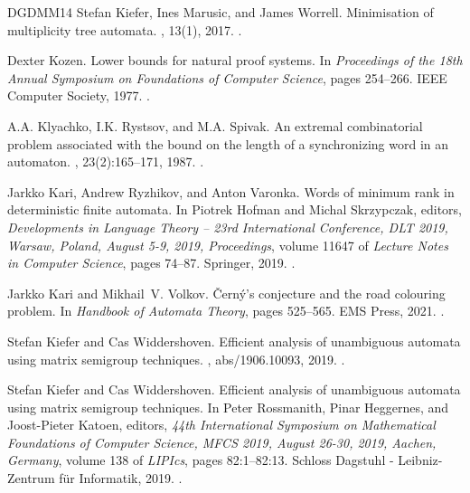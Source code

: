 \documentclass[11pt,a4paper]{amsart}
\theoremstyle{plain}
\theoremstyle{definition}
\theoremstyle{defC}
\theoremstyle{thmC}
\theoremstyle{plain}
\numberwithin{equation}{section}
\begin{document}
\begin{thebibliography}{DGDMM14}
Stefan Kiefer, Ines Marusic, and James Worrell.
\newblock Minimisation of multiplicity tree automata.
, 13(1), 2017.
\newblock \href {https://doi.org/10.23638/LMCS-13(1:16)2017}
  {}.

Dexter Kozen.
\newblock Lower bounds for natural proof systems.
\newblock In {\em Proceedings of the 18th Annual Symposium on Foundations of
  Computer Science}, pages 254--266. IEEE Computer Society, 1977.
\newblock \href {https://doi.org/10.1109/SFCS.1977.16}
  {}.

A.A. Klyachko, I.K. Rystsov, and M.A. Spivak.
\newblock An extremal combinatorial problem associated with the bound on the
  length of a synchronizing word in an automaton.
, 23(2):165--171, 1987.
\newblock \href {https://doi.org/10.1007/BF01071771}
  {}.

Jarkko Kari, Andrew Ryzhikov, and Anton Varonka.
\newblock Words of minimum rank in deterministic finite automata.
\newblock In Piotrek Hofman and Michal Skrzypczak, editors, {\em Developments
  in Language Theory -- 23rd International Conference, {DLT} 2019, Warsaw,
  Poland, August 5-9, 2019, Proceedings}, volume 11647 of {\em Lecture Notes in
  Computer Science}, pages 74--87. Springer, 2019.
\newblock \href {https://doi.org/10.1007/978-3-030-24886-4\_5}
  {}.

Jarkko Kari and Mikhail~V. Volkov.
\newblock \v{C}ern\'{y}’s conjecture and the road colouring problem.
\newblock In {\em Handbook of Automata Theory}, pages 525--565. EMS Press,
  2021.
\newblock \href {https://doi.org/10.4171/AUTOMATA-1/15}
  {}.

Stefan Kiefer and Cas Widdershoven.
\newblock Efficient analysis of unambiguous automata using matrix semigroup
  techniques.
, abs/1906.10093, 2019.
\newblock \href {https://arxiv.org/abs/1906.10093} {}.

Stefan Kiefer and Cas Widdershoven.
\newblock Efficient analysis of unambiguous automata using matrix semigroup
  techniques.
\newblock In Peter Rossmanith, Pinar Heggernes, and Joost{-}Pieter Katoen,
  editors, {\em 44th International Symposium on Mathematical Foundations of
  Computer Science, {MFCS} 2019, August 26-30, 2019, Aachen, Germany}, volume
  138 of {\em LIPIcs}, pages 82:1--82:13. Schloss Dagstuhl - Leibniz-Zentrum
  f{\"{u}}r Informatik, 2019.
\newblock \href {https://doi.org/10.4230/LIPICS.MFCS.2019.82}
  {}.


\end{thebibliography}
\end{document}
